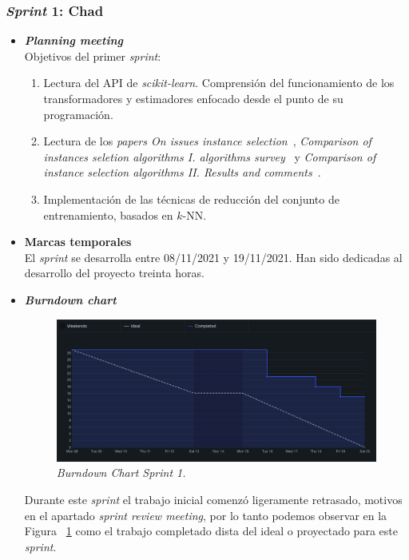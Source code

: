 \subsubsection{\textit{Sprint} 1: Chad}
\begin{itemize}
\item \textbf{\textit{Planning meeting}}\\
Objetivos del primer \textit{sprint}:
\begin{enumerate}
\item Lectura del API de \textit{scikit-learn}. Comprensión del funcionamiento de los transformadores y estimadores enfocado desde el punto de su programación.
\item Lectura de los \textit{papers On issues instance selection}~\cite{liu2002issues}, \textit{Comparison of instances seletion algorithms I. algorithms survey}~\cite{jankowski2004comparison} y \textit{Comparison of instance selection algorithms II. Results and comments}~\cite{grochowski2004comparison}.
\item Implementación de las técnicas de reducción del conjunto de entrenamiento, basados en $k$-NN.
\end{enumerate}

\item \textbf{Marcas temporales}\\
El \textit{sprint} se desarrolla entre 08/11/2021 y 19/11/2021. Han sido dedicadas al desarrollo del proyecto treinta horas.

\item \textbf{\textit{Burndown chart}}\\
\begin{figure}
\begin{center}
\includegraphics[width=\textwidth]{../img/anexos/sprints/BD-Sprint1}
\caption{\textit{Burndown Chart Sprint 1.}}\label{fig:BD-Sprint1}
\end{center}
\end{figure}
Durante este \textit{sprint} el trabajo inicial comenzó ligeramente retrasado, motivos en el apartado \textit{sprint review meeting}, por lo tanto podemos observar en la Figura ~\ref{fig:BD-Sprint1} como el trabajo completado dista del ideal o proyectado para este \textit{sprint}.


\end{itemize}
